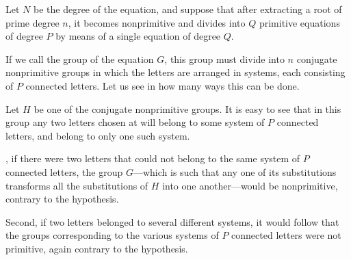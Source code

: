 Let $N$ be the degree of the equation, and suppose that after extracting a root
of prime degree $n$, it becomes nonprimitive and divides into $Q$ primitive
equations of degree $P$ by means of a single equation of degree $Q$.

If we call the group of the equation $G$, this group must divide into $n$
conjugate nonprimitive groups in which the letters are arranged in systems,
each consisting of $P$ connected letters. Let us see in how many ways this can
be done.

Let $H$ be one of the conjugate nonprimitive groups. It is easy to
see that in this group any two letters chosen at will belong to some system of
$P$ connected letters, and belong to only one such system.

, if there were two letters that
could not belong to the same system
of $P$ connected letters, the group $G$---which is such that any one of its
substitutions transforms all the substitutions of $H$ into one another---would
be nonprimitive, contrary to the hypothesis.


Second, if two letters belonged to several different systems, it would follow
that the groups corresponding to the various systems of $P$ connected letters
were not primitive, again contrary to the hypothesis.

